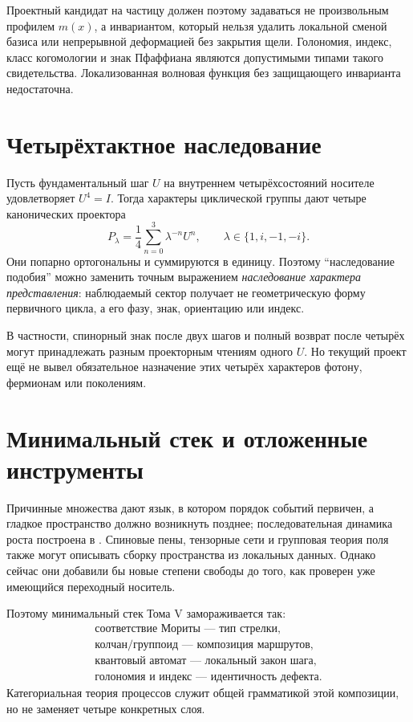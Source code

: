 Проектный кандидат на частицу должен поэтому задаваться не произвольным
профилем $m(x)$, а инвариантом, который нельзя удалить локальной сменой
базиса или непрерывной деформацией без закрытия щели. Голономия, индекс,
класс когомологии и знак Пфаффиана являются допустимыми типами такого
свидетельства. Локализованная волновая функция без защищающего инварианта
недостаточна.

\section{Четырёхтактное наследование}

Пусть фундаментальный шаг $U$ на внутреннем четырёхсостояний носителе
удовлетворяет $U^4=I$. Тогда характеры циклической группы дают четыре
канонических проектора
\begin{equation}
 P_\lambda=\frac14\sum_{n=0}^3\lambda^{-n}U^n,
 \qquad
 \lambda\in\{1,i,-1,-i\}.
 \label{eq:v5-transition-character-projectors}
\end{equation}
Они попарно ортогональны и суммируются в единицу. Поэтому ``наследование
подобия'' можно заменить точным выражением \emph{наследование характера
представления}: наблюдаемый сектор получает не геометрическую форму
первичного цикла, а его фазу, знак, ориентацию или индекс.

В частности, спинорный знак после двух шагов и полный возврат после
четырёх могут принадлежать разным проекторным чтениям одного $U$. Но
текущий проект ещё не вывел обязательное назначение этих четырёх
характеров фотону, фермионам или поколениям.

\section{Минимальный стек и отложенные инструменты}

Причинные множества дают язык, в котором порядок событий первичен, а
гладкое пространство должно возникнуть позднее; последовательная динамика
роста построена в . Спиновые пены, тензорные сети
и групповая теория поля также могут описывать сборку пространства из
локальных данных. Однако сейчас они добавили бы новые степени свободы до
того, как проверен уже имеющийся переходный носитель.

Поэтому минимальный стек Тома V замораживается так:
\begin{equation}
 \boxed{
 \begin{gathered}
 \text{соответствие Мориты --- тип стрелки},\\
 \text{колчан/группоид --- композиция маршрутов},\\
 \text{квантовый автомат --- локальный закон шага},\\
 \text{голономия и индекс --- идентичность дефекта}.
 \end{gathered}}
 \label{eq:v5-transition-language-stack}
\end{equation}
Категориальная теория процессов служит общей грамматикой этой композиции,
но не заменяет четыре конкретных слоя.

